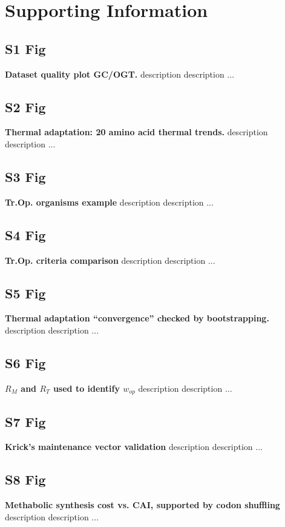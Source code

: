 \documentclass[10pt,letterpaper]{article}
\begin{document}
\section*{Supporting Information}

\subsection*{S1 Fig}
\label{fig:s1}
{\bf Dataset quality plot GC/OGT.}
description description ...

\subsection*{S2 Fig}
\label{fig:s2}
{\bf Thermal adaptation: 20 amino acid thermal trends. }
description description ...

\subsection*{S3 Fig}
\label{fig:s3}
{\bf Tr.Op. organisms example}
description description ...

\subsection*{S4 Fig}
\label{fig:s4}
{\bf Tr.Op. criteria comparison}
description description ...

\subsection*{S5 Fig}
\label{fig:s5}
{\bf Thermal adaptation ``convergence'' checked by bootstrapping.}
description description ...

\subsection*{S6 Fig}
\label{fig:s6}
{\bf $R_M$ and $R_T$ used to identify $w_{op}$ }
description description ...

\subsection*{S7 Fig}
\label{fig:s7}
{\bf Krick's maintenance vector validation}
description description ...

\subsection*{S8 Fig}
\label{fig:s8}
{\bf Methabolic synthesis cost vs. CAI, supported by codon shuffling}
description description ...
\end{document}

